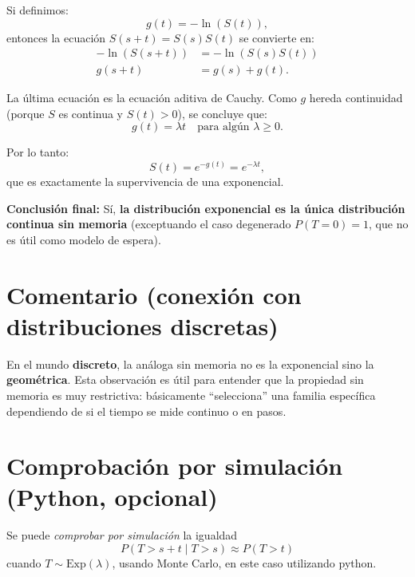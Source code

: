 \documentclass{article}
\theoremstyle{plain}
\theoremstyle{definition}
\begin{document}
Si definimos:
$$ g(t) = -\ln(S(t)), $$
entonces la ecuación $S(s+t)=S(s)S(t)$ se convierte en:
\begin{align*}
-\ln(S(s+t)) &= -\ln(S(s)S(t)) \\
g(s+t) &= g(s) + g(t).
\end{align*}

La última ecuación es la ecuación aditiva de Cauchy. Como $g$ hereda continuidad (porque $S$ es continua y $S(t)>0$), se concluye que:
$$ g(t) = \lambda t \quad \text{para algún } \lambda \ge 0. $$

Por lo tanto:
$$ S(t) = e^{-g(t)} = e^{-\lambda t}, $$
que es exactamente la supervivencia de una exponencial. 

\begin{flushright}
\qedsymbol
\end{flushright}

\textbf{Conclusión final:} Sí, \textbf{la distribución exponencial es la única distribución continua sin memoria} (exceptuando el caso degenerado $P(T=0)=1$, que no es útil como modelo de espera).

\section*{Comentario (conexión con distribuciones discretas)}

En el mundo \textbf{discreto}, la análoga sin memoria no es la exponencial sino la \textbf{geométrica}. Esta observación es útil para entender que la propiedad sin memoria es muy restrictiva: básicamente ``selecciona'' una familia específica dependiendo de si el tiempo se mide continuo o en pasos.

\section*{Comprobación por simulación (Python, opcional)}

Se puede \emph{comprobar por simulación} la igualdad
$$ P(T > s+t \mid T > s) \approx P(T > t) $$
cuando $T \sim \mathrm{Exp}(\lambda)$, usando Monte Carlo, en este caso utilizando python.
\end{document}
